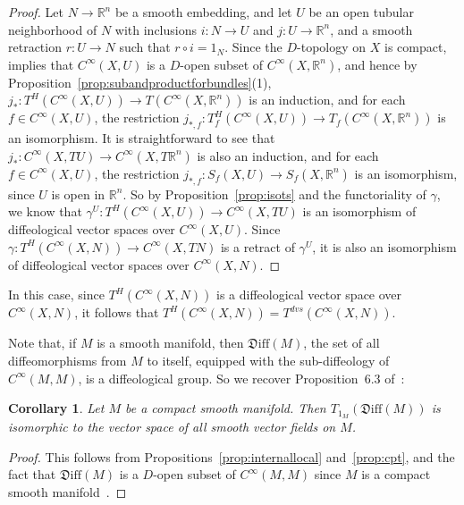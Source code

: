 \documentclass[12pt]{amsart}
\newtheorem{cor}[de]{Corollary}
\theoremstyle{remark}
\newcommand{\ra}{\to}
\newcommand{\Diff}{{\mathfrak{D}\mathrm{iff}}}
\def \R{\mathbb{R}}
\begin{document}
\begin{proof}
Let $N \ra \R^n$ be a smooth embedding,
and let $U$ be an open tubular neighborhood of $N$
with inclusions $i:N \ra U$ and $j:U \ra \R^n$,
and a smooth retraction $r:U \ra N$ such that $r \circ i=1_N$.
Since the $D$-topology on $X$ is compact,~\cite[Proposition~4.2]{CSW} implies that
$C^\infty(X,U)$ is a $D$-open subset of $C^\infty(X,\R^n)$,
and hence by Proposition~\ref{prop:subandproductforbundles}(1),
$j_*:T^H(C^\infty(X,U)) \ra T(C^\infty(X,\R^n))$ is an induction, and
for each $f \in C^\infty(X,U)$, the restriction
$j_{*,f}:T_f^H(C^\infty(X,U)) \ra T_f(C^\infty(X,\R^n))$ is an isomorphism.
It is straightforward to see that $j_*:C^\infty(X,TU) \ra C^\infty(X,T\R^n)$
is also an induction, and for each $f \in C^\infty(X,U)$,
the restriction $j_{*,f}:S_f(X,U) \ra S_f(X,\R^n)$
is an isomorphism, since $U$ is open in $\R^n$.
So by Proposition~\ref{prop:isots} and the functoriality of $\gamma$,
we know that $\gamma^U:T^H(C^\infty(X,U)) \ra C^\infty(X,TU)$ is an isomorphism
of diffeological vector spaces over $C^\infty(X,U)$.
Since $\gamma:T^H(C^\infty(X,N)) \ra C^\infty(X,TN)$ is a retract of $\gamma^U$,
it is also an isomorphism of diffeological vector spaces over $C^\infty(X,N)$.
\end{proof}

In this case, since $T^H(C^\infty(X,N))$ is
a diffeological vector space over $C^\infty(X,N)$,
it follows that $T^H(C^\infty(X,N))=T^{dvs}(C^\infty(X,N))$.

%
%
%
%
%
Note that, if $M$ is a smooth manifold,
then $\Diff(M)$, the set of all diffeomorphisms from $M$ to itself,
equipped with the sub-diffeology of $C^\infty(M,M)$,
is a diffeological group.
So we recover Proposition~6.3 of~\cite{HM}:

\begin{cor}\label{cor:cpt}
Let $M$ be a compact smooth manifold.
Then $T_{1_M}(\Diff(M))$ is isomorphic to the vector space of
all smooth vector fields on $M$.
\end{cor}
\begin{proof}
This follows from Propositions~\ref{prop:internallocal} and~\ref{prop:cpt},
and the fact that $\Diff(M)$ is a $D$-open subset of $C^\infty(M,M)$
since $M$ is a compact smooth manifold~\cite[Corollary~4.15]{CSW}.
\end{proof}
\end{document}
